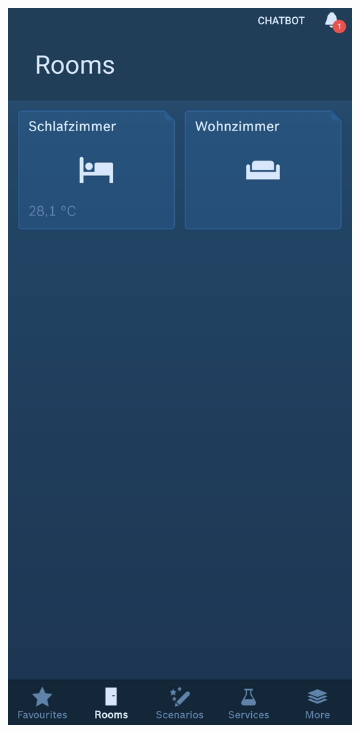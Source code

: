 \begin{figure}[t]
    \centering
      \begin{subfigure}[t]{.44\textwidth}
        \vspace*{0pt}
        \includegraphics[width=\textwidth]{graphics/homescreen.jpg}

\end{subfigure}
\end{figure}
